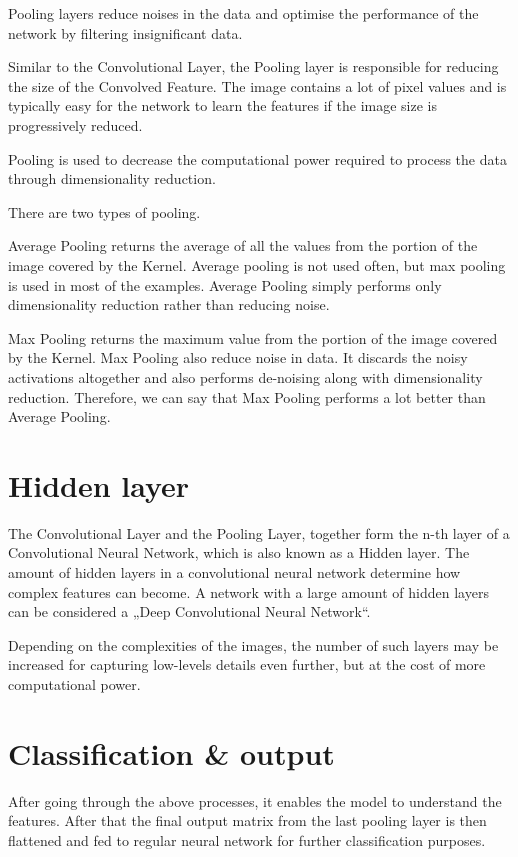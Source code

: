 \documentclass[a4paper,13pt,twoside]{book}
\begin{document}

Pooling layers reduce noises in the data and optimise the performance of the network by filtering insignificant data.

Similar to the Convolutional Layer, the Pooling layer is responsible for reducing the size of the Convolved Feature.
The image contains a lot of pixel values and is typically easy for the network to learn the features if the image size is progressively reduced.

Pooling is used to decrease the computational power required to process the data through dimensionality reduction.

There are two types of pooling.

Average Pooling returns the average of all the values from the portion of the image covered by the Kernel.
Average pooling is not used often, but max pooling is used in most of the examples.
Average Pooling simply performs only dimensionality reduction rather than reducing noise.

Max Pooling returns the maximum value from the portion of the image covered by the Kernel.
Max Pooling also reduce noise in data. It discards the noisy activations altogether and also performs de-noising along with dimensionality reduction.
Therefore, we can say that Max Pooling performs a lot better than Average Pooling.

\section{Hidden layer}
The Convolutional Layer and the Pooling Layer, together form the n-th layer of a Convolutional Neural Network, which is also known as a Hidden layer.
The amount of hidden layers in a convolutional neural network determine how complex features can become. A network with a large amount of hidden layers can be considered a „Deep Convolutional Neural Network“.

Depending on the complexities of the images, the number of such layers may be increased for capturing low-levels details even further, but at the cost of more computational power.

\section{Classification & output}

After going through the above processes, it enables the model to understand the features. After that the final output matrix from the last pooling layer is then flattened and fed to regular neural network for further classification purposes.
\end{document}
